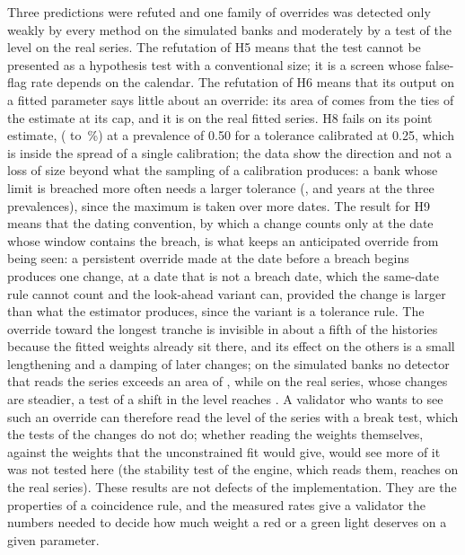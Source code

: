 Three predictions were refuted and one family of overrides was detected only weakly by every method on the simulated banks and moderately by a test of the level on the real series. The refutation of H5 means that the test cannot be presented as a hypothesis test with a conventional size; it is a screen whose false-flag rate depends on the calendar. The refutation of H6 means that its output on a fitted parameter says little about an override: its area of \fitAucCEngine{} comes from the ties of the estimate at its cap, and it is \realEngineAuc{} on the real fitted series. H8 fails on its point estimate, \fitMisCTol{} (\fitMisCTolLo{} to \fitMisCTolHi{}\,\%) at a prevalence of 0.50 for a tolerance calibrated at 0.25, which is inside the spread of a single calibration; the data show the direction and not a loss of size beyond what the sampling of a calibration produces: a bank whose limit is breached more often needs a larger tolerance (\deltaA{}, \deltaB{} and \deltaC{} years at the three prevalences), since the maximum is taken over more dates. The result for H9 means that the dating convention, by which a change counts only at the date whose window contains the breach, is what keeps an anticipated override from being seen: a persistent override made at the date before a breach begins produces one change, at a date that is not a breach date, which the same-date rule cannot count and the look-ahead variant can, provided the change is larger than what the estimator produces, since the variant is a tolerance rule. The override toward the longest tranche is invisible in about a fifth of the histories because the fitted weights already sit there, and its effect on the others is a small lengthening and a damping of later changes; on the simulated banks no detector that reads the series exceeds an area of \wTopAuc{}, while on the real series, whose changes are steadier, a test of a shift in the level reaches \wRealTopAuc{}. A validator who wants to see such an override can therefore read the level of the series with a break test, which the tests of the changes do not do; whether reading the weights themselves, against the weights that the unconstrained fit would give, would see more of it was not tested here (the stability test of the engine, which reads them, reaches \realWAucStab{} on the real series). These results are not defects of the implementation. They are the properties of a coincidence rule, and the measured rates give a validator the numbers needed to decide how much weight a red or a green light deserves on a given parameter.
